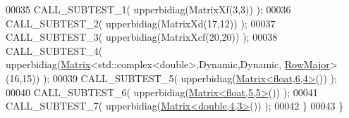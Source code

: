 \begin{DoxyCode}
00035    CALL\_SUBTEST\_1( upperbidiag(MatrixXf(3,3)) );
00036    CALL\_SUBTEST\_2( upperbidiag(MatrixXd(17,12)) );
00037    CALL\_SUBTEST\_3( upperbidiag(MatrixXcf(20,20)) );
00038    CALL\_SUBTEST\_4( upperbidiag(\hyperlink{group___core___module_class_eigen_1_1_matrix}{Matrix}<std::complex<double>,Dynamic,Dynamic,
      \hyperlink{group__enums_ggaacded1a18ae58b0f554751f6cdf9eb13acfcde9cd8677c5f7caf6bd603666aae3}{RowMajor}>(16,15)) );
00039    CALL\_SUBTEST\_5( upperbidiag(\hyperlink{group___core___module_class_eigen_1_1_matrix}{Matrix<float,6,4>}()) );
00040    CALL\_SUBTEST\_6( upperbidiag(\hyperlink{group___core___module_class_eigen_1_1_matrix}{Matrix<float,5,5>}()) );
00041    CALL\_SUBTEST\_7( upperbidiag(\hyperlink{group___core___module_class_eigen_1_1_matrix}{Matrix<double,4,3>}()) );
00042   \}
00043 \}
\end{DoxyCode}
